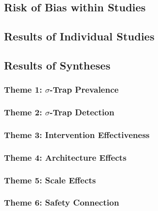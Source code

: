
\subsection{Risk of Bias within Studies}\label{sec:rob-results}


\subsection{Results of Individual Studies}\label{sec:individual-results}


\subsection{Results of Syntheses}\label{sec:synthesis-results}


\subsubsection{Theme 1: $\sigma$-Trap Prevalence}
\subsubsection{Theme 2: $\sigma$-Trap Detection}
\subsubsection{Theme 3: Intervention Effectiveness}
\subsubsection{Theme 4: Architecture Effects}
\subsubsection{Theme 5: Scale Effects}
\subsubsection{Theme 6: Safety Connection}

